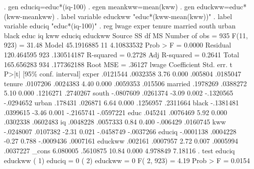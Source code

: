 . gen educiq=educ*(iq-100)
{\smallskip}
. egen meankww=mean(kww)
{\smallskip}
. gen educkww=educ*(kww-meankww)
{\smallskip}
. label variable educkww "educ*(kww-mean(kww))"
{\smallskip}
. label variable educiq "educ*(iq-100)"
{\smallskip}
. reg lwage exper tenure married south urban black educ iq kww educiq educkww
{\smallskip}
      Source {\VBAR}       SS           df       MS      Number of obs   =       935
   F(11, 923)      =     31.48
       Model {\VBAR}  45.1916885        11  4.10833532   Prob > F        =    0.0000
    Residual {\VBAR}  120.464595       923  .130514187   R-squared       =    0.2728
   Adj R-squared   =    0.2641
       Total {\VBAR}  165.656283       934  .177362188   Root MSE        =    .36127
{\smallskip}
       lwage {\VBAR} Coefficient  Std. err.      t    P>|t|     [95\% conf. interval]
       exper {\VBAR}   .0121544   .0032358     3.76   0.000      .005804    .0185047
      tenure {\VBAR}   .0107206   .0024383     4.40   0.000     .0059353     .015506
     married {\VBAR}   .1978269   .0388272     5.10   0.000     .1216271    .2740267
       south {\VBAR}  -.0807609   .0261374    -3.09   0.002    -.1320565   -.0294652
       urban {\VBAR}    .178431    .026871     6.64   0.000     .1256957    .2311664
       black {\VBAR}  -.1381481   .0399615    -3.46   0.001    -.2165741   -.0597221
        educ {\VBAR}    .045241   .0076469     5.92   0.000     .0302338    .0602483
          iq {\VBAR}   .0048228   .0057333     0.84   0.400     -.006429    .0160745
         kww {\VBAR}  -.0248007   .0107382    -2.31   0.021    -.0458749   -.0037266
      educiq {\VBAR}  -.0001138   .0004228    -0.27   0.788    -.0009436    .0007161
     educkww {\VBAR}    .002161   .0007957     2.72   0.007     .0005994    .0037227
       _cons {\VBAR}   6.080005   .5610875    10.84   0.000     4.978849     7.18116
{\smallskip}
. test educiq educkww
{\smallskip}
 ( 1)  educiq = 0
 ( 2)  educkww = 0
{\smallskip}
       F(  2,   923) =    4.19
            Prob > F =    0.0154
{\smallskip}
